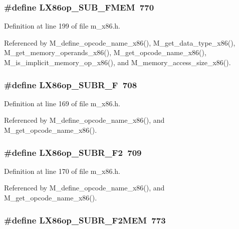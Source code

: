 \subsubsection{\setlength{\rightskip}{0pt plus 5cm}\#define LX86op\_\-SUB\_\-FMEM~770}\label{m__x86_8h_cc49951533a6ad65e20eaebff2a4e856}




Definition at line 199 of file m\_\-x86.h.

Referenced by M\_\-define\_\-opcode\_\-name\_\-x86(), M\_\-get\_\-data\_\-type\_\-x86(), M\_\-get\_\-memory\_\-operands\_\-x86(), M\_\-get\_\-opcode\_\-name\_\-x86(), M\_\-is\_\-implicit\_\-memory\_\-op\_\-x86(), and M\_\-memory\_\-access\_\-size\_\-x86().
\subsubsection{\setlength{\rightskip}{0pt plus 5cm}\#define LX86op\_\-SUBR\_\-F~708}\label{m__x86_8h_375c8bcd8d385368201ffa0fb28c8956}




Definition at line 169 of file m\_\-x86.h.

Referenced by M\_\-define\_\-opcode\_\-name\_\-x86(), and M\_\-get\_\-opcode\_\-name\_\-x86().
\subsubsection{\setlength{\rightskip}{0pt plus 5cm}\#define LX86op\_\-SUBR\_\-F2~709}\label{m__x86_8h_42bc37b574855fd9b5b4a49be82bc0ba}




Definition at line 170 of file m\_\-x86.h.

Referenced by M\_\-define\_\-opcode\_\-name\_\-x86(), and M\_\-get\_\-opcode\_\-name\_\-x86().
\subsubsection{\setlength{\rightskip}{0pt plus 5cm}\#define LX86op\_\-SUBR\_\-F2MEM~773}\label{m__x86_8h_0a6f8b85f2a0c70014c51b81907b6231}





